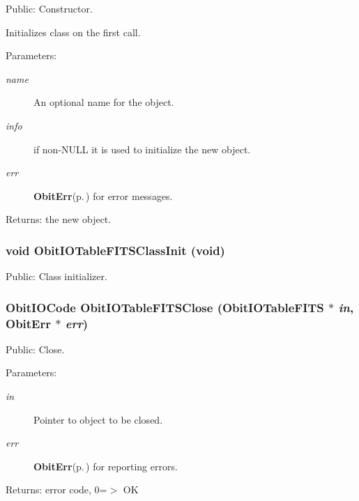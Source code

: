 Public: Constructor. 

Initializes class on the first call. \begin{Desc}
\item[Parameters:]
\begin{description}
\item[{\em name}]An optional name for the object. \item[{\em info}]if non-NULL it is used to initialize the new object. \item[{\em err}]{\bf Obit\-Err}{\rm (p.\,\pageref{structObitErr})} for error messages. \end{description}
\end{Desc}
\begin{Desc}
\item[Returns:]the new object. \end{Desc}
\subsubsection{\setlength{\rightskip}{0pt plus 5cm}void Obit\-IOTable\-FITSClass\-Init (void)}\label{ObitIOTableFITS_8h_a3}


Public: Class initializer. 

\subsubsection{\setlength{\rightskip}{0pt plus 5cm}Obit\-IOCode Obit\-IOTable\-FITSClose ({\bf Obit\-IOTable\-FITS} $\ast$ {\em in}, {\bf Obit\-Err} $\ast$ {\em err})}\label{ObitIOTableFITS_8h_a10}


Public: Close. 

\begin{Desc}
\item[Parameters:]
\begin{description}
\item[{\em in}]Pointer to object to be closed. \item[{\em err}]{\bf Obit\-Err}{\rm (p.\,\pageref{structObitErr})} for reporting errors. \end{description}
\end{Desc}
\begin{Desc}
\item[Returns:]error code, 0=$>$ OK \end{Desc}
